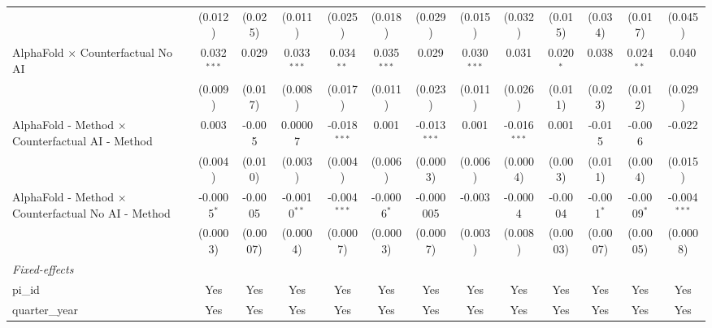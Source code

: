 \begin{tabular}{lcccccccccccc}
                                                              & (0.012)       & (0.025)       & (0.011)        & (0.025)        & (0.018)       & (0.029)        & (0.015)       & (0.032)        & (0.015)       & (0.034)      & (0.017)       & (0.045)\\   
   AlphaFold $\times$ Counterfactual No AI                    & 0.032$^{***}$ & 0.029         & 0.033$^{***}$  & 0.034$^{**}$   & 0.035$^{***}$ & 0.029          & 0.030$^{***}$ & 0.031          & 0.020$^{*}$   & 0.038        & 0.024$^{**}$  & 0.040\\   
                                                              & (0.009)       & (0.017)       & (0.008)        & (0.017)        & (0.011)       & (0.023)        & (0.011)       & (0.026)        & (0.011)       & (0.023)      & (0.012)       & (0.029)\\   
   AlphaFold - Method $\times$ Counterfactual AI - Method     & 0.003         & -0.005        & 0.00007        & -0.018$^{***}$ & 0.001         & -0.013$^{***}$ & 0.001         & -0.016$^{***}$ & 0.001         & -0.015       & -0.006        & -0.022\\   
                                                              & (0.004)       & (0.010)       & (0.003)        & (0.004)        & (0.006)       & (0.0003)       & (0.006)       & (0.0004)       & (0.003)       & (0.011)      & (0.004)       & (0.015)\\   
   AlphaFold - Method $\times$ Counterfactual No AI - Method  & -0.0005$^{*}$ & -0.0005       & -0.0010$^{**}$ & -0.004$^{***}$ & -0.0006$^{*}$ & -0.000005      & -0.003        & -0.0004        & -0.0004       & -0.001$^{*}$ & -0.0009$^{*}$ & -0.004$^{***}$\\   
                                                              & (0.0003)      & (0.0007)      & (0.0004)       & (0.0007)       & (0.0003)      & (0.0007)       & (0.003)       & (0.008)        & (0.0003)      & (0.0007)     & (0.0005)      & (0.0008)\\   
   \midrule
   \emph{Fixed-effects}\\
   pi\_id                                                     & Yes           & Yes           & Yes            & Yes            & Yes           & Yes            & Yes           & Yes            & Yes           & Yes          & Yes           & Yes\\  
   quarter\_year                                              & Yes           & Yes           & Yes            & Yes            & Yes           & Yes            & Yes           & Yes            & Yes           & Yes          & Yes           & Yes\\  

\end{tabular}
